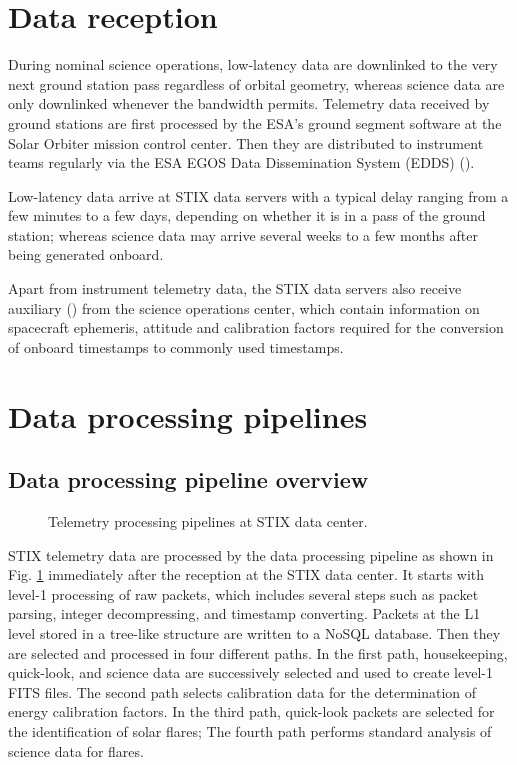 \documentclass[referee]{aa} %
\begin{document}
\section{Data reception}
During nominal science operations, low-latency data 
are downlinked to the very next ground station pass regardless of orbital geometry, 
whereas science data are only downlinked whenever the bandwidth permits.
Telemetry data received by ground stations are first processed by the ESA's ground segment software at the Solar Orbiter mission control center. 
Then they are distributed to instrument teams regularly via the ESA EGOS Data Dissemination System (EDDS) (\cite{EDDS}). 

Low-latency data arrive at STIX data servers with a  typical delay ranging from 
a few minutes to a few days, depending on whether it is in a pass
of the ground station; whereas science data may arrive several weeks to a few months after being generated onboard.

Apart from instrument telemetry data, the STIX data servers also receive
  auxiliary (\cite{spice1996,spice2018})  from the science operations center,
which contain information on spacecraft ephemeris, attitude and  
calibration factors required for the conversion of onboard timestamps 
to commonly used timestamps. 


\section{Data processing pipelines}
\subsection{Data processing pipeline overview}

\begin{figure}
    \centering
    \caption{Telemetry processing pipelines at STIX data center.}
    \label{fig:main_pipelines}
\end{figure}
STIX telemetry data are processed by the data processing pipeline  
as shown in Fig. \ref{fig:main_pipelines} immediately after the reception at the STIX data center.  It starts with level-1 processing of raw packets, which includes several steps such as  packet parsing,  integer decompressing, and timestamp converting. 
Packets at the L1 level stored in a tree-like structure  are written to a NoSQL database. Then they are selected and processed in four different paths. 
In the first path,  housekeeping, quick-look, and science data are successively selected and used to create level-1 FITS files. 
The second path selects calibration data for the determination
 of energy calibration factors.   In the third path, quick-look packets are selected  for the identification of solar  flares; 
The fourth path performs standard analysis of science data for flares.
\end{document}

